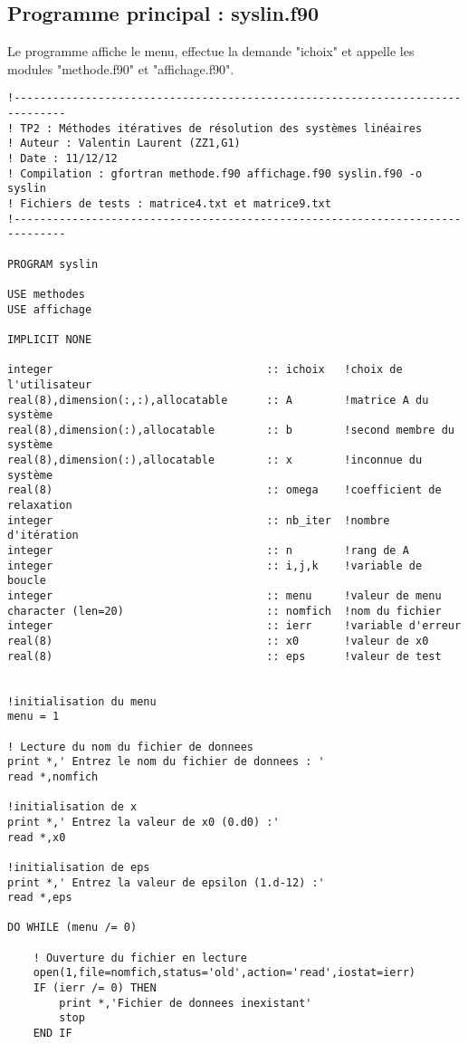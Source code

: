 \documentclass{report}
\begin{document}
\subsection{Programme principal : syslin.f90}
Le programme affiche le menu, effectue la demande "ichoix" et appelle
les modules "methode.f90" et "affichage.f90".
\begin{small}
\begin{verbatim}
!------------------------------------------------------------------------------
! TP2 : Méthodes itératives de résolution des systèmes linéaires
! Auteur : Valentin Laurent (ZZ1,G1)
! Date : 11/12/12
! Compilation : gfortran methode.f90 affichage.f90 syslin.f90 -o syslin
! Fichiers de tests : matrice4.txt et matrice9.txt
!------------------------------------------------------------------------------

PROGRAM syslin

USE methodes
USE affichage

IMPLICIT NONE

integer                                 :: ichoix   !choix de l'utilisateur
real(8),dimension(:,:),allocatable      :: A        !matrice A du système
real(8),dimension(:),allocatable        :: b        !second membre du système
real(8),dimension(:),allocatable        :: x        !inconnue du système
real(8)                                 :: omega    !coefficient de relaxation
integer                                 :: nb_iter  !nombre d'itération
integer                                 :: n        !rang de A
integer                                 :: i,j,k    !variable de boucle
integer                                 :: menu     !valeur de menu
character (len=20)                      :: nomfich  !nom du fichier
integer                                 :: ierr     !variable d'erreur
real(8)                                 :: x0       !valeur de x0
real(8)                                 :: eps      !valeur de test


!initialisation du menu
menu = 1

! Lecture du nom du fichier de donnees
print *,' Entrez le nom du fichier de donnees : '
read *,nomfich

!initialisation de x
print *,' Entrez la valeur de x0 (0.d0) :'
read *,x0

!initialisation de eps
print *,' Entrez la valeur de epsilon (1.d-12) :'
read *,eps

DO WHILE (menu /= 0)

    ! Ouverture du fichier en lecture
    open(1,file=nomfich,status='old',action='read',iostat=ierr)
    IF (ierr /= 0) THEN
        print *,'Fichier de donnees inexistant'
        stop
    END IF


\end{verbatim}
\end{small}
\end{document}
